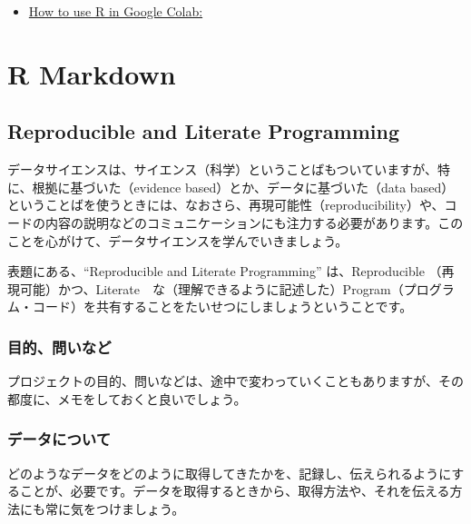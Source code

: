 \documentclass[
]{bxjsbook}
\providecommand{\tightlist}{%
  \setlength{\itemsep}{0pt}\setlength{\parskip}{0pt}}
\theoremstyle{definition}
\theoremstyle{definition}
\theoremstyle{definition}
\theoremstyle{definition}
\theoremstyle{remark}
\begin{document}
\begin{itemize}
\tightlist
\item
  \href{https://towardsdatascience.com/how-to-use-r-in-google-colab-b6e02d736497}{How to use R in Google Colab:}
\end{itemize}

\hypertarget{rmarkdown}{%
\section{R Markdown}\label{rmarkdown}}

\hypertarget{reproducible-and-literate-programming}{%
\subsection{Reproducible and Literate Programming}\label{reproducible-and-literate-programming}}

データサイエンスは、サイエンス（科学）ということばもついていますが、特に、根拠に基づいた（evidence based）とか、データに基づいた（data based）ということばを使うときには、なおさら、再現可能性（reproducibility）や、コードの内容の説明などのコミュニケーションにも注力する必要があります。このことを心がけて、データサイエンスを学んでいきましょう。

表題にある、``Reproducible and Literate Programming'' は、Reproducible （再現可能）かつ、Literate　な（理解できるように記述した）Program（プログラム・コード）を共有することをたいせつにしましょうということです。

\hypertarget{ux76eeux7684ux554fux3044ux306aux3069}{%
\subsubsection{目的、問いなど}\label{ux76eeux7684ux554fux3044ux306aux3069}}

プロジェクトの目的、問いなどは、途中で変わっていくこともありますが、その都度に、メモをしておくと良いでしょう。

\hypertarget{ux30c7ux30fcux30bfux306bux3064ux3044ux3066}{%
\subsubsection{データについて}\label{ux30c7ux30fcux30bfux306bux3064ux3044ux3066}}

どのようなデータをどのように取得してきたかを、記録し、伝えられるようにすることが、必要です。データを取得するときから、取得方法や、それを伝える方法にも常に気をつけましょう。
\end{document}
